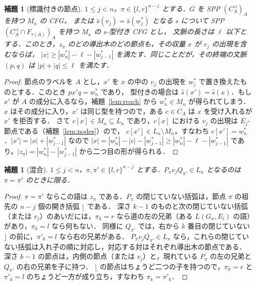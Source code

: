 \documentclass[11pt,a4paper]{ltjsarticle}
\numberwithin{equation}{section}
\theoremstyle{plain}
\newtheorem{lemma}[theorem]{補題}
\theoremstyle{definition}
\theoremstyle{remark}
\theoremstyle{plain}
\newcommand{\Lc}{^{\lhd}}
\newcommand{\Lfl}{\lfloor}
\newcommand{\Rfl}{\rfloor}
\begin{document}
\begin{lemma}[標識付きの節点]\label{lem:marked-node}
$1\le j<n$，$\pi\in\{l,r\}^{n-j}$ とする．$G$ を SPP $(C_A\Lc)_A$ を持つ $M_n$ の CFG，
または $\widehat s(v_j)=\widehat s(w^*_j)$ となる $s$ について SPP $(C_A\Lc\cap F_{\tau(A)})_A$ を持つ $M_n$ の $s$-型付き CFG とし，
文脈の長さは $\ell$ 以下とする．このとき，$z_\pi$ のどの導出木のどの節点も，その収量 $x$ が $v_j$ の出現を含むならば，
$|x|\ge|w^*_n|-\ell-|w^*_{j-1}|$ を満たす．同じことだが，その終端の文脈 $(p,q)$ は $|p|+|q|\le\ell$ を満たす．
\end{lemma}
\begin{proof}
節点のラベルを $A$ とし，$x'$ を $x$ の中の $v_j$ の出現を $w^*_j$ で置き換えたものとする．このとき $px'q=w^*_n$ であり，
型付きの場合は $\widehat s(x')=\widehat s(x)$．もし $x'$ が $A$ の成分に入るなら，補題~\ref{lem:reach} から $w^*_n\in M_n$ が得られてしまう．
$x$ はその成分に入り，$x'$ は同じ型を持つので，ある $c\in C_A$ は $x$ を受け入れるが $x'$ を拒否する．
さて $c[x]\in M_n\subseteq L_n$ であり，$c[x]$ における $v_j$ の出現は $E_j$-節点である（補題~\ref{lem:nodes}）ので，
$c[x']\in L_n\setminus M_n$，すなわち $c[x']=w^*_n$．$|x'|=|x|+|w^*_{j-1}|$ なので
$|x|=|w^*_n|-|c|-|w^*_{j-1}|\ge|w^*_n|-\ell-|w^*_{j-1}|$ であり，$|z_\pi|=|w^*_n|-|w^*_{j-1}|$ から二つ目の形が得られる．
\end{proof}

\begin{lemma}[混合]\label{lem:mixing}
$1\le j<n$，$\pi,\pi'\in\{l,r\}^{n-j}$ とする．$P_\pi v_jQ_{\pi'}\in L_n$ となるのは $\pi=\pi'$ のときに限る．
\end{lemma}
\begin{proof}
$\pi=\pi'$ ならこの語は $z_\pi$ である．$P_\pi$ の閉じていない括弧は，節点 $\pi$ の祖先の $n-j$ 個の開き括弧 $\Lfl$ である．
深さ $k-1$ のものと次の閉じていない括弧（または $v_j$）のあいだには，$\pi_k=r$ なら道の左の兄弟（ある $L(G_n,E_i)$ の語）があり，$\pi_k=l$ なら何もない．
同様に $Q_{\pi'}$ では，右から $k$ 番目の閉じていない $\Rfl$ の前に，$\pi'_k=l$ なら右の兄弟がある．
$P_\pi v_jQ_{\pi'}\in L_n$ なら，これらの閉じていない括弧は入れ子の順に対応し，対応する対はそれぞれ導出木の節点である．
深さ $k-1$ の節点は，内側の節点（または $v_j$）と，現れている $P_\pi$ の左の兄弟と $Q_{\pi'}$ の右の兄弟を子に持つ．
$\Lfl$ の節点はちょうど二つの子を持つので，$\pi_k=r$ と $\pi'_k=l$ のちょうど一方が成り立ち，すなわち $\pi_k=\pi'_k$．
\end{proof}
\end{document}
